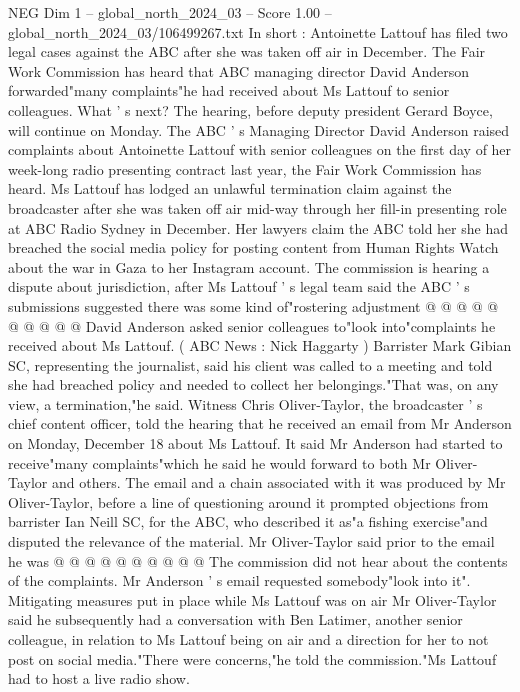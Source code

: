\begin{textsample}{NEG Dim 1 – global\_north\_2024\_03 – Score 1.00 – global\_north\_2024\_03/106499267.txt}  \label{ex:f1_neg_395}
In short : Antoinette Lattouf has filed two legal cases against the ABC after she was taken off air in December.
The Fair Work Commission has heard that ABC managing director David Anderson forwarded"many complaints"he had received about Ms Lattouf to senior colleagues.
What ' s next?
The hearing, before deputy president Gerard Boyce, will continue on Monday.
The ABC ' s Managing Director David Anderson raised complaints about Antoinette Lattouf with senior colleagues on the first day of her week-long radio presenting contract last year, the Fair Work Commission has heard.
Ms Lattouf has lodged an unlawful termination claim against the broadcaster after she was taken off air mid-way through her fill-in presenting role at ABC Radio Sydney in December.
Her lawyers claim the ABC told her she had breached the social media policy for posting content from Human Rights Watch about the war in Gaza to her Instagram account.
The commission is hearing a dispute about jurisdiction, after Ms Lattouf ' s legal team said the ABC ' s submissions suggested there was some kind of"rostering adjustment @ @ @ @ @ @ @ @ @ @ David Anderson asked senior colleagues to"look into"complaints he received about Ms Lattouf. ( ABC News : Nick Haggarty ) Barrister Mark Gibian SC, representing the journalist, said his client was called to a meeting and told she had breached policy and needed to collect her belongings."That was, on any view, a termination,"he said.
Witness Chris Oliver-Taylor, the broadcaster ' s chief content officer, told the hearing that he received an email from Mr Anderson on Monday, December 18 about Ms Lattouf.
It said Mr Anderson had started to receive"many complaints"which he said he would forward to both Mr Oliver-Taylor and others.
The email and a chain associated with it was produced by Mr Oliver-Taylor, before a line of questioning around it prompted objections from barrister Ian Neill SC, for the ABC, who described it as"a fishing exercise"and disputed the relevance of the material.
Mr Oliver-Taylor said prior to the email he was @ @ @ @ @ @ @ @ @ @ The commission did not hear about the contents of the complaints.
Mr Anderson ' s email requested somebody"look into it".
Mitigating measures put in place while Ms Lattouf was on air Mr Oliver-Taylor said he subsequently had a conversation with Ben Latimer, another senior colleague, in relation to Ms Lattouf being on air and a direction for her to not post on social media."There were concerns,"he told the commission."Ms Lattouf had to host a live radio show.

\end{textsample}
